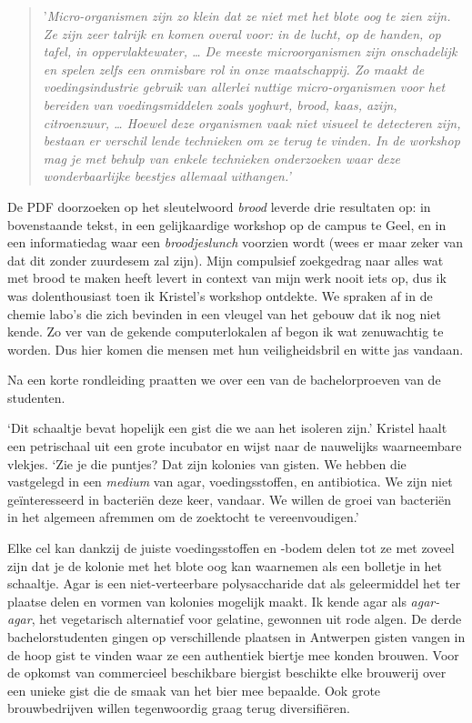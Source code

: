 \documentclass[
  11pt,
  dutch,
]{memoir}
\begin{document}
\begin{quote}
'\emph{Micro-organismen zijn zo klein dat ze niet met het blote oog te
zien zijn. Ze zijn zeer talrijk en komen overal voor: in de lucht, op de
handen, op tafel, in oppervlaktewater, \ldots{} De meeste
microorganismen zijn onschadelijk en spelen zelfs een onmisbare rol in
onze maatschappij. Zo maakt de voedingsindustrie gebruik van allerlei
nuttige micro-organismen voor het bereiden van voedingsmiddelen zoals
yoghurt, brood, kaas, azijn, citroenzuur, \ldots{} Hoewel deze
organismen vaak niet visueel te detecteren zijn, bestaan er verschil
lende technieken om ze terug te vinden. In de workshop mag je met behulp
van enkele technieken onderzoeken waar deze wonderbaarlijke beestjes
allemaal uithangen.'}
\end{quote}

De PDF doorzoeken op het sleutelwoord \emph{brood} leverde drie
resultaten op: in bovenstaande tekst, in een gelijkaardige workshop op
de campus te Geel, en in een informatiedag waar een \emph{broodjeslunch}
voorzien wordt (wees er maar zeker van dat dit zonder zuurdesem zal
zijn). Mijn compulsief zoekgedrag naar alles wat met brood te maken
heeft levert in context van mijn werk nooit iets op, dus ik was
dolenthousiast toen ik Kristel's workshop ontdekte. We spraken af in de
chemie labo's die zich bevinden in een vleugel van het gebouw dat ik nog
niet kende. Zo ver van de gekende computerlokalen af begon ik wat
zenuwachtig te worden. Dus hier komen die mensen met hun veiligheidsbril
en witte jas vandaan.

Na een korte rondleiding praatten we over een van de bachelorproeven van
de studenten.

`Dit schaaltje bevat hopelijk een gist die we aan het isoleren zijn.'
Kristel haalt een petrischaal uit een grote incubator en wijst naar de
nauwelijks waarneembare vlekjes. `Zie je die puntjes? Dat zijn kolonies
van gisten. We hebben die vastgelegd in een \emph{medium} van agar,
voedingsstoffen, en antibiotica. We zijn niet geïnteresseerd in
bacteriën deze keer, vandaar. We willen de groei van bacteriën in het
algemeen afremmen om de zoektocht te vereenvoudigen.'

Elke cel kan dankzij de juiste voedingsstoffen en -bodem delen tot ze
met zoveel zijn dat je de kolonie met het blote oog kan waarnemen als
een bolletje in het schaaltje. Agar is een niet-verteerbare
polysaccharide dat als geleermiddel het ter plaatse delen en vormen van
kolonies mogelijk maakt. Ik kende agar als \emph{agar-agar}, het
vegetarisch alternatief voor gelatine, gewonnen uit rode algen. De derde
bachelorstudenten gingen op verschillende plaatsen in Antwerpen gisten
vangen in de hoop gist te vinden waar ze een authentiek biertje mee
konden brouwen. Voor de opkomst van commercieel beschikbare biergist
beschikte elke brouwerij over een unieke gist die de smaak van het bier
mee bepaalde. Ook grote brouwbedrijven willen tegenwoordig graag terug
diversifiëren.
\end{document}
